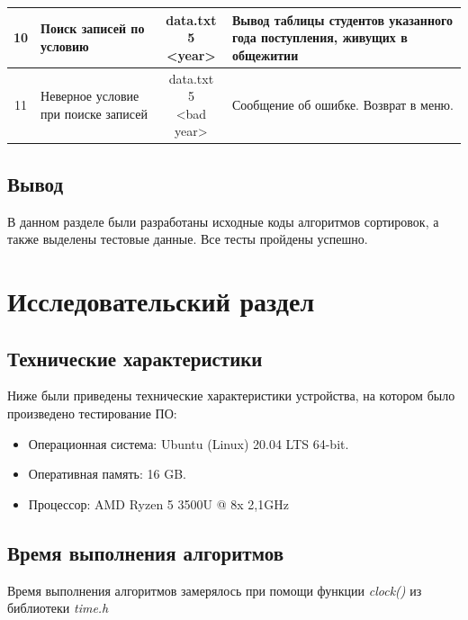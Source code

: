 \begin{table}
\begin{center}
\begin{tabular}{|c|m{8em}|c|m{12em}|}
			\hline
			10 & Поиск записей по условию & \specialcell{data.txt \\ 5 \\ <year>} & Вывод таблицы студентов указанного года поступления, живущих в общежитии \\
			\hline
			11 & Неверное условие при поиске записей & \specialcell{data.txt \\ 5 \\ <bad year>} & Сообщение об ошибке. Возврат в меню.\\
			\hline
		\end{tabular}
	\end{center}
\end{table}

\section{Вывод}

В данном разделе были разработаны исходные коды алгоритмов сортировок, а также выделены тестовые данные. Все тесты пройдены успешно.

\chapter{Исследовательский раздел}

\section{Технические характеристики}

Ниже были приведены технические характеристики устройства, на котором было произведено тестирование ПО:

\begin{itemize}
	\item Операционная система: Ubuntu (Linux) 20.04 LTS 64-bit.
	\item Оперативная память: 16 GB.
	\item Процессор: AMD Ryzen 5 3500U @ 8x 2,1GHz
\end{itemize}

\section{Время выполнения алгоритмов}

Время выполнения алгоритмов замерялось при помощи функции \textit{clock()} из библиотеки \textit{time.h}

